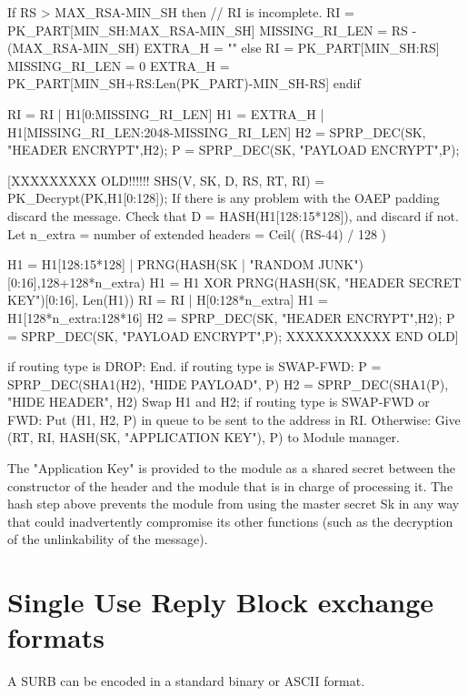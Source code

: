         If RS > MAX_RSA-MIN_SH then 
            // RI is incomplete.
            RI = PK_PART[MIN_SH:MAX_RSA-MIN_SH]
            MISSING_RI_LEN = RS - (MAX_RSA-MIN_SH)
            EXTRA_H = ""
        else
            RI = PK_PART[MIN_SH:RS]
            MISSING_RI_LEN = 0
            EXTRA_H = PK_PART[MIN_SH+RS:Len(PK_PART)-MIN_SH-RS]
        endif

        RI = RI | H1[0:MISSING_RI_LEN]
        H1 = EXTRA_H | H1[MISSING_RI_LEN:2048-MISSING_RI_LEN]
        H2 = SPRP_DEC(SK, "HEADER ENCRYPT",H2);
        P = SPRP_DEC(SK, "PAYLOAD ENCRYPT",P);

 [XXXXXXXXX OLD!!!!!!
        SHS(V, SK, D, RS, RT, RI) = PK_Decrypt(PK,H1[0:128]);
        If there is any problem with the OAEP padding discard the message.
        Check that D = HASH(H1[128:15*128]), and discard if not.
        Let n_extra = number of extended headers = Ceil( (RS-44) / 128 )
                  
        H1 = H1[128:15*128] | PRNG(HASH(SK | "RANDOM 
                                               JUNK")[0:16],128+128*n_extra)
        H1 = H1 XOR PRNG(HASH(SK, "HEADER SECRET KEY")[0:16], Len(H1))
        RI = RI | H[0:128*n_extra]
        H1 = H1[128*n_extra:128*16]
        H2 = SPRP_DEC(SK, "HEADER ENCRYPT",H2);
        P = SPRP_DEC(SK, "PAYLOAD ENCRYPT",P);
  XXXXXXXXXXX END OLD]

        if routing type is DROP:
                End.
        if routing type is SWAP-FWD:
                P = SPRP_DEC(SHA1(H2), "HIDE PAYLOAD", P)
                H2 = SPRP_DEC(SHA1(P), "HIDE HEADER", H2)
                Swap H1 and H2;
        if routing type is SWAP-FWD or FWD:
                Put (H1, H2, P) in queue to be sent to the address in RI.
        Otherwise:
                Give (RT, RI, HASH(SK, "APPLICATION KEY"), P) to
                Module manager.

The "Application Key" is provided to the module as a shared secret
between the constructor of the header and the module that is in charge
of processing it.  The hash step above prevents the module from using
the master secret Sk in any way that could inadvertently compromise
its other functions (such as the decryption of the unlinkability of
the message).

\section{Single Use Reply Block exchange formats}

A SURB can be encoded in a standard binary or ASCII format.

